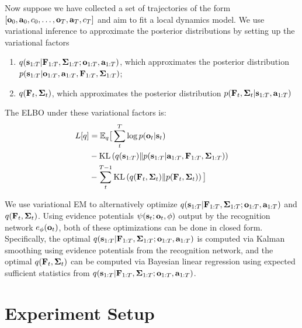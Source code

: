 Now suppose we have collected a set of trajectories of the form $\left[\mathbf{o}_0,\mathbf{a}_0,c_0,\ldots,\mathbf{o}_{T},\mathbf{a}_{T},c_{T}\right]$ and aim to fit a local dynamics model. We use variational inference to approximate the posterior distributions by setting up the variational factors
\vspace{-.5em}
\begin{enumerate}
    \itemsep0em
    \item $q(\mathbf{s}_{1:T} | \mathbf{F}_{1:T}, \bm{\Sigma}_{1:T}; \mathbf{o}_{1:T}, \mathbf{a}_{1:T})$, which approximates the posterior distribution $p(\mathbf{s}_{1:T} | \mathbf{o}_{1:T}, \mathbf{a}_{1:T}, \mathbf{F}_{1:T}, \bm{\Sigma}_{1:T})$;
    \item $q(\mathbf{F}_t, \bm{\Sigma}_t)$, which approximates the posterior distribution $p(\mathbf{F}_t, \bm{\Sigma}_t | \mathbf{s}_{1:T}, \mathbf{a}_{1:T})$
\end{enumerate}
\vspace{-.5em}
The ELBO under these variational factors is:
\begin{align*}
    L[q] &= \mathbb{E}_q \big[\sum_t^T \log p(\mathbf{o}_t | \mathbf{s}_t)\\ &- \mathrm{KL}\left(q(\mathbf{s}_{1:T})\|p(\mathbf{s}_{1:T} | \mathbf{a}_{1:T}, \mathbf{F}_{1:T}, \bm{\Sigma}_{1:T})\right)\\
    &- \sum_t^{T - 1} \mathrm{KL}\left(q(\mathbf{F}_t, \bm{\Sigma}_t)\|p(\mathbf{F}_t, \bm{\Sigma}_t)\right)
    \big]
\end{align*}

We use variational EM to alternatively optimize $q(\mathbf{s}_{1:T} | \mathbf{F}_{1:T}, \bm{\Sigma}_{1:T}; \mathbf{o}_{1:T}, \mathbf{a}_{1:T})$ and $q(\mathbf{F}_t, \bm{\Sigma}_t)$. Using evidence potentials $\psi(\mathbf{s}_t;\mathbf{o}_t,\phi)$ output by the recognition network $e_\phi(\mathbf{o}_t)$, both of these optimizations can be done in closed form. Specifically, the optimal $q(\mathbf{s}_{1:T} | \mathbf{F}_{1:T}, \bm{\Sigma}_{1:T}; \mathbf{o}_{1:T}, \mathbf{a}_{1:T})$ is computed via Kalman smoothing using evidence potentials from the recognition network, and the optimal $q(\mathbf{F}_t, \bm{\Sigma}_t)$ can be computed via Bayesian linear regression using expected sufficient statistics from $q(\mathbf{s}_{1:T} | \mathbf{F}_{1:T}, \bm{\Sigma}_{1:T}; \mathbf{o}_{1:T}, \mathbf{a}_{1:T})$.


\section{Experiment Setup}
\label{sec:supp-set}

